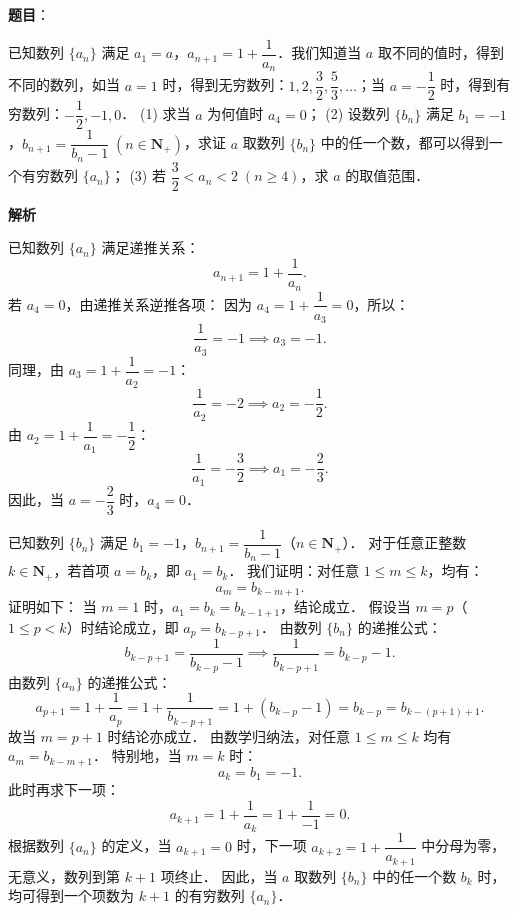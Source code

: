 \begin{answer}

\textbf{题目}：

已知数列 $\{a_n\}$ 满足 $a_1 = a$，$a_{n+1} = 1 + \dfrac{1}{a_n}$．我们知道当 $a$ 取不同的值时，得到不同的数列，如当 $a = 1$ 时，得到无穷数列：$1, 2, \dfrac{3}{2}, \dfrac{5}{3}, \dots$；当 $a = -\dfrac{1}{2}$ 时，得到有穷数列：$-\dfrac{1}{2}, -1, 0$．
(1) 求当 $a$ 为何值时 $a_4 = 0$；
(2) 设数列 $\{b_n\}$ 满足 $b_1 = -1$，$b_{n+1} = \dfrac{1}{b_n - 1} \; (n \in \mathbf{N}_+)$，求证 $a$ 取数列 $\{b_n\}$ 中的任一个数，都可以得到一个有穷数列 $\{a_n\}$；
(3) 若 $\dfrac{3}{2} < a_n < 2 \; (n \geqslant 4)$，求 $a$ 的取值范围．

\textbf{解析}


已知数列 $\{a_n\}$ 满足递推关系：
\nopagebreak[4]
\[
a_{n+1} = 1 + \frac{1}{a_n}.
\]
若 $a_4 = 0$，由递推关系逆推各项：
因为 $a_4 = 1 + \dfrac{1}{a_3} = 0$，所以：
\nopagebreak[4]
\[
\frac{1}{a_3} = -1 \implies a_3 = -1.
\]
同理，由 $a_3 = 1 + \dfrac{1}{a_2} = -1$：
\nopagebreak[4]
\[
\frac{1}{a_2} = -2 \implies a_2 = -\frac{1}{2}.
\]
由 $a_2 = 1 + \dfrac{1}{a_1} = -\dfrac{1}{2}$：
\nopagebreak[4]
\[
\frac{1}{a_1} = -\frac{3}{2} \implies a_1 = -\frac{2}{3}.
\]
因此，当 $a = -\dfrac{2}{3}$ 时，$a_4 = 0$．


已知数列 $\{b_n\}$ 满足 $b_1 = -1$，$b_{n+1} = \dfrac{1}{b_n - 1}$（$n \in \mathbf{N}_+$）．
对于任意正整数 $k \in \mathbf{N}_+$，若首项 $a = b_k$，即 $a_1 = b_k$．
我们证明：对任意 $1 \leqslant m \leqslant k$，均有：
\nopagebreak[4]
\[
a_m = b_{k - m + 1}.
\]
证明如下：
当 $m = 1$ 时，$a_1 = b_k = b_{k - 1 + 1}$，结论成立．
假设当 $m = p$（$1 \leqslant p < k$）时结论成立，即 $a_p = b_{k - p + 1}$．
由数列 $\{b_n\}$ 的递推公式：
\nopagebreak[4]
\[
b_{k - p + 1} = \frac{1}{b_{k - p} - 1} \implies \frac{1}{b_{k - p + 1}} = b_{k - p} - 1.
\]
由数列 $\{a_n\}$ 的递推公式：
\nopagebreak[4]
\[
a_{p+1} = 1 + \frac{1}{a_p} = 1 + \frac{1}{b_{k - p + 1}} = 1 + (b_{k - p} - 1) = b_{k - p} = b_{k - (p + 1) + 1}.
\]
故当 $m = p + 1$ 时结论亦成立．
由数学归纳法，对任意 $1 \leqslant m \leqslant k$ 均有 $a_m = b_{k - m + 1}$．
特别地，当 $m = k$ 时：
\nopagebreak[4]
\[
a_k = b_1 = -1.
\]
此时再求下一项：
\nopagebreak[4]
\[
a_{k+1} = 1 + \frac{1}{a_k} = 1 + \frac{1}{-1} = 0.
\]
根据数列 $\{a_n\}$ 的定义，当 $a_{k+1} = 0$ 时，下一项 $a_{k+2} = 1 + \dfrac{1}{a_{k+1}}$ 中分母为零，无意义，数列到第 $k+1$ 项终止．
因此，当 $a$ 取数列 $\{b_n\}$ 中的任一个数 $b_k$ 时，均可得到一个项数为 $k+1$ 的有穷数列 $\{a_n\}$．


\end{answer}
